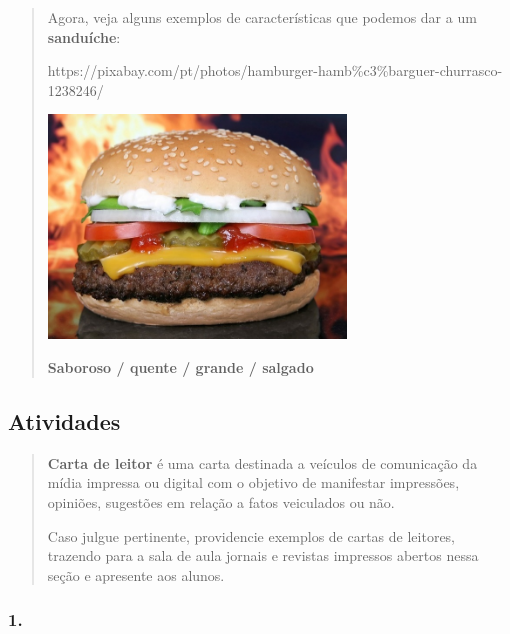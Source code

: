 \begin{quote}
Agora, veja alguns exemplos de características que podemos dar a um
\textbf{sanduíche}:

https://pixabay.com/pt/photos/hamburger-hamb\%c3\%barguer-churrasco-1238246/

\includegraphics[width=3.11183in,height=2.34375in]{media/image22.jpeg}

\textbf{Saboroso / quente / grande / salgado}
\end{quote}

\subsection{Atividades}\label{atividades-6}

\begin{quote}
\textbf{Carta de leitor} é uma carta destinada a veículos de comunicação
da mídia impressa ou digital com o objetivo de manifestar impressões,
opiniões, sugestões em relação a fatos veiculados ou não.

Caso julgue pertinente, providencie exemplos de cartas de leitores,
trazendo para a sala de aula jornais e revistas impressos abertos nessa
seção e apresente aos alunos.
\end{quote}

\subsubsection{1. }\label{section-57}


